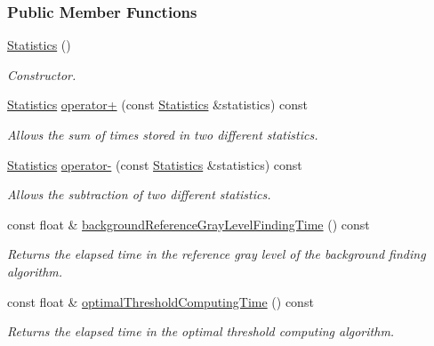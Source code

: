 \subsubsection*{Public Member Functions}
\begin{CompactItemize}
\item 
\hyperlink{class_statistics_60ddd90a571ed4c3ce8c0f6317a36d63}{Statistics} ()
\begin{CompactList}\small\item\em Constructor. \item\end{CompactList}\item 
\hyperlink{class_statistics}{Statistics} \hyperlink{class_statistics_cb07c98a63e07fdb1476ffb282b84676}{operator+} (const \hyperlink{class_statistics}{Statistics} \&statistics) const 
\begin{CompactList}\small\item\em Allows the sum of times stored in two different statistics. \item\end{CompactList}\item 
\hyperlink{class_statistics}{Statistics} \hyperlink{class_statistics_529bed34d909d88440214d6983779043}{operator-} (const \hyperlink{class_statistics}{Statistics} \&statistics) const 
\begin{CompactList}\small\item\em Allows the subtraction of two different statistics. \item\end{CompactList}\item 
const float \& \hyperlink{class_statistics_d65adc1b3bd1d560408c5f9e06fde3d4}{backgroundReferenceGrayLevelFindingTime} () const 
\begin{CompactList}\small\item\em Returns the elapsed time in the reference gray level of the background finding algorithm. \item\end{CompactList}\item 
const float \& \hyperlink{class_statistics_3a364709b9fe8dbefd03b3bb45d9a89d}{optimalThresholdComputingTime} () const 
\begin{CompactList}\small\item\em Returns the elapsed time in the optimal threshold computing algorithm. \item\end{CompactList}\item 

\end{CompactItemize}
